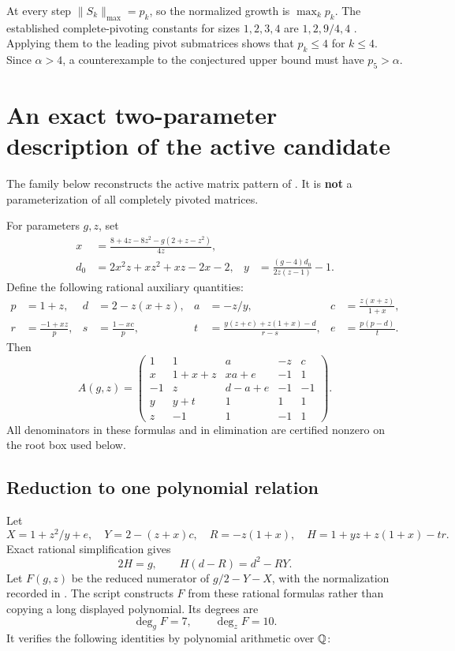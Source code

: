 \documentclass[11pt,letterpaper]{article}
\newcommand{\normmax}[1]{\lVert #1\rVert_{\max}}
\newcommand{\code}[1]{\texttt{\detokenize{#1}}}
\begin{document}
At every step $\normmax{S_k}=p_k$, so the normalized growth is $\max_k p_k$. The established complete-pivoting constants for sizes $1,2,3,4$ are $1,2,9/4,4$ \cite{ceu}. Applying them to the leading pivot submatrices shows that $p_k\le4$ for $k\le4$. Since $\alpha>4$, a counterexample to the conjectured upper bound must have $p_5>\alpha$.

\section{An exact two-parameter description of the active candidate}
The family below reconstructs the active matrix pattern of \cite[Eq.~(2.1)]{ceu}. It is \textbf{not} a parameterization of all completely pivoted matrices.

For parameters $g,z$, set
\begin{align}
 x&=\frac{8+4z-8z^2-g(2+z-z^2)}{4z},\label{eq:x}\\
 d_0&=2x^2z+xz^2+xz-2x-2,
 &y&=\frac{(g-4)d_0}{2z(z-1)}-1.\label{eq:y}
\end{align}
Define the following rational auxiliary quantities:
\begin{align*}
 p&=1+z,& d&=2-z(x+z),&a&=-z/y,&c&=\frac{z(x+z)}{1+x},\\
 r&=\frac{-1+xz}{p},&s&=\frac{1-xc}{p},&
 t&=\frac{y(z+c)+z(1+x)-d}{r-s},&e&=\frac{p(p-d)}{t}.
\end{align*}
Then
\begin{equation}\label{eq:candidate}
 A(g,z)=\begin{pmatrix}
 1&1&a&-z&c\\
 x&1+x+z&xa+e&-1&1\\
 -1&z&d-a+e&-1&-1\\
 y&y+t&1&1&1\\
 z&-1&1&-1&1
 \end{pmatrix}.
\end{equation}
All denominators in these formulas and in elimination are certified nonzero on the root box used below.

\subsection{Reduction to one polynomial relation}
Let
\[
 X=1+z^2/y+e,\quad Y=2-(z+x)c,\quad R=-z(1+x),
 \quad H=1+yz+z(1+x)-tr.
\]
Exact rational simplification gives
\[
           2H=g,\qquad H(d-R)=d^2-RY.
\]
Let $F(g,z)$ be the reduced numerator of $g/2-Y-X$, with the normalization recorded in \code{data/F.txt}. The script \code{derive_algebra.py} constructs $F$ from these rational formulas rather than copying a long displayed polynomial. Its degrees are
\[
             \deg_g F=7,\qquad \deg_z F=10.
\]
It verifies the following identities by polynomial arithmetic over $\mathbb Q$:
\end{document}
